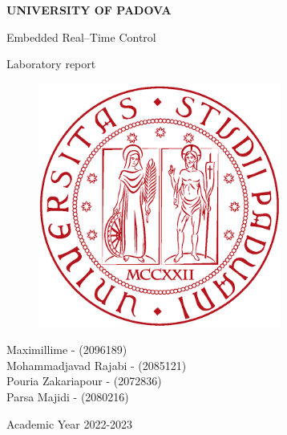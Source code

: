 \documentclass[english]{article}
\begin{document}
\setcounter{section}{-1} %
\begin{titlepage}

	\begin{center}
		\begin{Large} \textbf{UNIVERSITY OF PADOVA} \\
		\end{Large} \vspace{1cm}
		\vspace{3cm}
		\begin{Large} Embedded Real--Time Control \end{Large}
		\par\end{center}

	\begin{center}
		\begin{Large}Laboratory report\\
		\end{Large}
		\par\end{center}

	\begin{center}
		\vspace{2cm}
		\begin{figure}[!htb]
			\centering \includegraphics[width=8cm]{figures/unipd-logo.png}\\

		\end{figure}

		\par\end{center}

	\begin{center}
		\vspace{2cm}
		\begin{Large} 
                Maximillime - (2096189) \\
                Mohammadjavad Rajabi - (2085121) \\
                Pouria Zakariapour - (2072836) \\
                Parsa Majidi - (2080216)  \\
		\end{Large} \vspace{2cm}
		\begin{Large} Academic Year 2022-2023 \end{Large}
		\par\end{center}


\end{titlepage}
\end{document}
